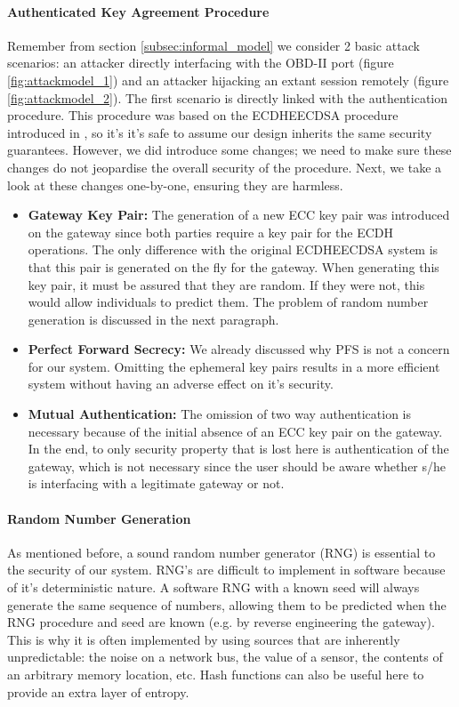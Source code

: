 \paragraph{Authenticated Key Agreement Procedure}
Remember from section \ref{subsec:informal_model} we consider 2 basic attack scenarios: an attacker directly interfacing with the OBD-II port (figure \ref{fig:attackmodel_1}) and an attacker hijacking an extant session remotely (figure \ref{fig:attackmodel_2}). The first scenario is directly linked with the authentication procedure. This procedure was based on the ECDHE\textunderscore ECDSA procedure introduced in \cite{RFC4492}, so it's it's safe to assume our design inherits the same security guarantees. However, we did introduce some changes; we need to make sure these changes do not jeopardise the overall security of the procedure. Next, we take a look at these changes one-by-one, ensuring they are harmless.
\begin{itemize}
	\item \textbf{Gateway Key Pair:} The generation of a new ECC key pair was introduced on the gateway since both parties require a key pair for the ECDH operations. The only difference with the original ECDHE\textunderscore ECDSA system is that this pair is generated on the fly for the gateway. When generating this key pair, it must be assured that they are random. If they were not, this would allow individuals to predict them. The problem of random number generation is discussed in the next paragraph.
	
	\item \textbf{Perfect Forward Secrecy:} We already discussed why PFS is not a concern for our system. Omitting the ephemeral key pairs results in a more efficient system without having an adverse effect on it's security.
	
	\item \textbf{Mutual Authentication:} The omission of two way authentication is necessary because of the initial absence of an ECC key pair on the gateway. In the end, to only security property that is lost here is authentication of the gateway, which is not necessary since the user should be aware whether s/he is interfacing with a legitimate gateway or not.
\end{itemize} 

\paragraph{Random Number Generation} As mentioned before, a sound random number generator (RNG) is essential to the security of our system. RNG's are difficult to implement in software because of it's deterministic nature. A software RNG with a known seed will always generate the same sequence of numbers, allowing them to be predicted when the RNG procedure and seed are known (e.g. by reverse engineering the gateway). This is why it is often implemented by using sources that are inherently unpredictable: the noise on a network bus, the value of a sensor, the contents of an arbitrary memory location, etc. Hash functions can also be useful here to provide an extra layer of entropy. 


